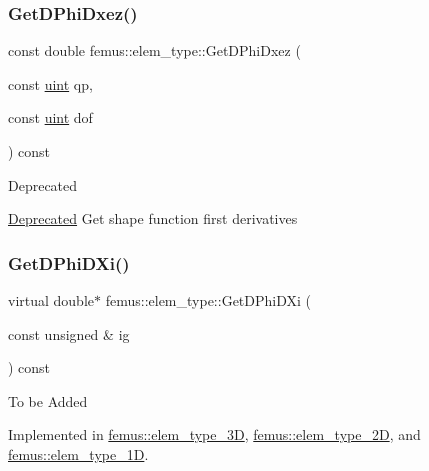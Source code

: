 \mbox{\label{classfemus_1_1elem__type_a8de9e4d4d56ef38431a5050269390e1a}} 
\subsubsection{\texorpdfstring{Get\+D\+Phi\+Dxez()}{GetDPhiDxez()}}
{\footnotesize\ttfamily const double femus\+::elem\+\_\+type\+::\+Get\+D\+Phi\+Dxez (\begin{DoxyParamCaption}\item[{const \mbox{\hyperlink{_typedefs_8hpp_a91ad9478d81a7aaf2593e8d9c3d06a14}{uint}}}]{qp,  }\item[{const \mbox{\hyperlink{_typedefs_8hpp_a91ad9478d81a7aaf2593e8d9c3d06a14}{uint}}}]{dof }\end{DoxyParamCaption}) const\hspace{0.3cm}{\ttfamily [inline]}}

\begin{DoxyRefDesc}{Deprecated}
\item[\mbox{\hyperlink{deprecated__deprecated000018}{Deprecated}}]Get shape function first derivatives \end{DoxyRefDesc}
\mbox{\label{classfemus_1_1elem__type_a6efb6026b9fe89912ec367b235bfccc7}} 
\subsubsection{\texorpdfstring{Get\+D\+Phi\+D\+Xi()}{GetDPhiDXi()}}
{\footnotesize\ttfamily virtual double$\ast$ femus\+::elem\+\_\+type\+::\+Get\+D\+Phi\+D\+Xi (\begin{DoxyParamCaption}\item[{const unsigned \&}]{ig }\end{DoxyParamCaption}) const\hspace{0.3cm}{\ttfamily [pure virtual]}}

To be Added 

Implemented in \mbox{\hyperlink{classfemus_1_1elem__type__3_d_aff869fa323fd20f83fed73f4a28de006}{femus\+::elem\+\_\+type\+\_\+3D}}, \mbox{\hyperlink{classfemus_1_1elem__type__2_d_a11838ba0522b27348770989555114c94}{femus\+::elem\+\_\+type\+\_\+2D}}, and \mbox{\hyperlink{classfemus_1_1elem__type__1_d_a27ff9f2a7f26c961b9b9d96aa87723d2}{femus\+::elem\+\_\+type\+\_\+1D}}.

